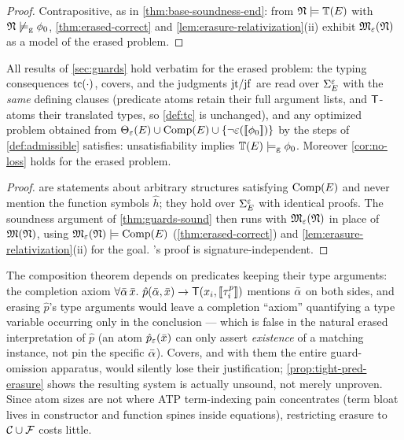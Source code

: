 \begin{proof}
  Contrapositive, as in \cref{thm:base-soundness-end}: from
  $\mathfrak{N} \models \mathbb{T}(E)$ with $\mathfrak{N} \not\models_{\mathrm{g}} \phi_0$,
  \cref{thm:erased-correct} and \cref{lem:erasure-relativization}(ii)
  exhibit $\mathfrak{M}_{\varepsilon}(\mathfrak{N})$ as a model of the erased problem.
\end{proof}

\begin{theorem}[Composition]
  \label{thm:composition}
  All results of \cref{sec:guards} hold verbatim for the erased problem:
  the typing consequences $\mathrm{tc}(\cdot)$, covers, and the judgments
  $\mathrm{jt}/\mathrm{jf}$ are read over $\Sigma_{E}^{\varepsilon}$ with the \emph{same} defining clauses
  (predicate atoms retain their full argument lists, and $\mathsf{T}$-atoms their
  translated types, so \cref{def:tc} is unchanged), and any optimized
  problem obtained from $\Theta_{\varepsilon}(E) \cup \mathrm{Comp}(E) \cup \{\neg\varepsilon([\![ \phi_0 ]\!])\}$
  by the steps of \cref{def:admissible} satisfies: unsatisfiability
  implies $\mathbb{T}(E) \models_{\mathrm{g}} \phi_0$.  Moreover \cref{cor:no-loss} holds for the
  erased problem.
\end{theorem}

\begin{proof}
   are statements about arbitrary
  structures satisfying $\mathrm{Comp}(E)$ and never mention the function symbols
  $\hat h$; they hold over $\Sigma_{E}^{\varepsilon}$ with identical proofs.  The soundness
  argument of \cref{thm:guards-sound} then runs with $\mathfrak{M}_{\varepsilon}(\mathfrak{N})$ in place of
  $\mathfrak{M}(\mathfrak{N})$, using $\mathfrak{M}_{\varepsilon}(\mathfrak{N}) \models \mathrm{Comp}(E)$ (\cref{thm:erased-correct}) and
  \cref{lem:erasure-relativization}(ii) for the goal.
  's proof is signature-independent.
\end{proof}

\begin{remark}
  \label{rem:no-pred-erasure}
  The composition theorem depends on predicates keeping their type
  arguments: the completion axiom
  $\forall\bar{\alpha}\,\bar{x}.\ \hat p(\bar{\alpha}, \bar{x}) \rightarrow
  \mathsf{T}(x_i, [\![ \tau^p_i ]\!])$ mentions $\bar{\alpha}$ on both sides, and
  erasing $\hat p$'s type arguments would leave a completion ``axiom''
  quantifying a type variable occurring only in the conclusion --- which
  is false in the natural erased interpretation of $\hat p$ (an atom
  $\hat p_{\varepsilon}(\bar{x})$ can only assert \emph{existence} of a matching
  instance, not pin the specific $\bar{\alpha}$).  Covers, and with them
  the entire guard-omission apparatus, would silently lose their
  justification; \cref{prop:tight-pred-erasure} shows the resulting
  system is actually unsound, not merely unproven.  Since atom sizes are
  not where ATP term-indexing pain concentrates (term bloat lives in
  constructor and function spines inside equations), restricting erasure
  to $\mathcal{C} \cup \mathcal{F}$ costs little.
\end{remark}

